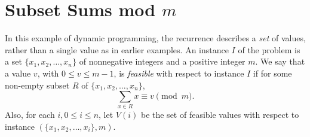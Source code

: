 \documentclass[11pt,fleqn]{exam}
\begin{document}
\newpage

\section{Subset Sums mod $m$}
In this example of dynamic programming, the recurrence describes a {\em set} of values, rather than a single value as in earlier examples.
An instance $I$ of the problem is a set $\{x_1, x_2, \ldots, x_n\}$ of nonnegative integers and a positive integer $m$. We say that a value $v$, with $0 \le v \le m-1$, is \emph{feasible} with respect to instance $I$ if for some non-empty subset $R$ of $\{x_1, x_2, \ldots, x_n\}$, 
\[ 
\sum_{x \in R} x \equiv v \pmod m.  
\]
Also, for each $i, 0\le i \le n$, let $V(i)$ be the set of feasible values with respect to instance $( \{x_1, x_2, \ldots, x_i\}, m)$.
\end{document}

